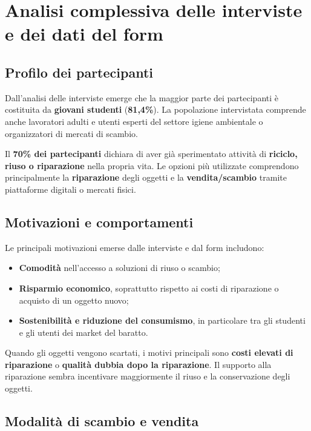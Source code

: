 \documentclass[12pt,a4paper]{article}
\begin{document}
\newpage


\section{Analisi complessiva delle interviste e dei dati del form}

\subsection{Profilo dei partecipanti}

Dall’analisi delle interviste emerge che la maggior parte dei partecipanti è costituita da \textbf{giovani studenti} (\textbf{81,4\%}). La popolazione intervistata comprende anche lavoratori adulti e utenti esperti del settore igiene ambientale o organizzatori di mercati di scambio.  

Il \textbf{70\% dei partecipanti} dichiara di aver già sperimentato attività di \textbf{riciclo, riuso o riparazione} nella propria vita. Le opzioni più utilizzate comprendono principalmente la \textbf{riparazione} degli oggetti e la \textbf{vendita/scambio} tramite piattaforme digitali o mercati fisici.  

\subsection{Motivazioni e comportamenti}

Le principali motivazioni emerse dalle interviste e dal form includono:  
\begin{itemize}
    \item \textbf{Comodità} nell’accesso a soluzioni di riuso o scambio;  
    \item \textbf{Risparmio economico}, soprattutto rispetto ai costi di riparazione o acquisto di un oggetto nuovo;  
    \item \textbf{Sostenibilità e riduzione del consumismo}, in particolare tra gli studenti e gli utenti dei market del baratto.  
\end{itemize}

Quando gli oggetti vengono scartati, i motivi principali sono \textbf{costi elevati di riparazione} o \textbf{qualità dubbia dopo la riparazione}. Il supporto alla riparazione sembra incentivare maggiormente il riuso e la conservazione degli oggetti.  

\subsection{Modalità di scambio e vendita}
\end{document}
